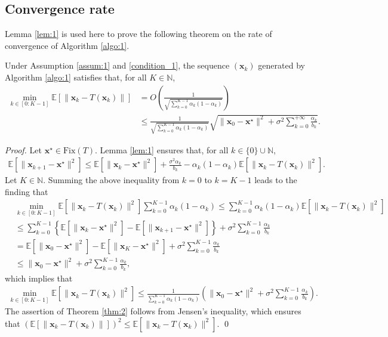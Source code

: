 \documentclass[smallextended,referee,envcountsect,]{svjour3}
\begin{document}
\subsection{Convergence rate}
\label{sec:3.2}
Lemma \ref{lem:1} is used here to prove the following theorem on the rate of convergence of Algorithm \ref{algo:1}.

\begin{theorem}\label{thm:2}
Under Assumption \ref{assum:1} and \eqref{condition_1}, the sequence $(\bm{x}_k)$ generated by Algorithm \ref{algo:1} satisfies that, for all $K \in \mathbb{N}$,
\begin{align*}
\min_{k \in [0:K-1]} \mathbb{E} \left[ \| \bm{x}_k - T (\bm{x}_{k})\| \right]
&= 
O \left( \frac{1}{\sqrt{\sum_{k=0}^{K-1} \alpha_k (1 - \alpha_k)}} \right)\\
&\leq
\frac{1}{\sqrt{\sum_{k=0}^{K-1} \alpha_k (1 - \alpha_k)}}
\sqrt{ \| \bm{x}_{0} - \bm{x}^\star \|^2 
+ 
\sigma^2 \sum_{k=0}^{+ \infty} \frac{\alpha_k}{b_k}
}.
\end{align*}
\end{theorem}

\begin{proof}
Let $\bm{x}^\star \in \mathrm{Fix}(T)$. Lemma \ref{lem:1} ensures that, for all $k \in \{0\} \cup \mathbb{N}$,
\begin{align*}
\mathbb{E} \left[ \| \bm{x}_{k+1} - \bm{x}^\star \|^2 \right]
\leq 
\mathbb{E} \left[ \| \bm{x}_{k} - \bm{x}^\star \|^2 \right] + \frac{\sigma^2 \alpha_k}{b_k}
- \alpha_k (1 - \alpha_k) \mathbb{E} \left[ \| \bm{x}_k - T (\bm{x}_{k})\|^2 \right].
\end{align*}
Let $K \in \mathbb{N}$. Summing the above inequality from $k = 0$ to $k = K-1$ leads to the finding that 
\begin{align*}
&
\min_{k \in [0:K-1]} \mathbb{E} \left[ \| \bm{x}_k - T (\bm{x}_{k})\|^2 \right]
\sum_{k=0}^{K-1} \alpha_k (1 - \alpha_k)
\leq
\sum_{k=0}^{K-1} \alpha_k (1 - \alpha_k) \mathbb{E} \left[ \| \bm{x}_k - T (\bm{x}_{k})\|^2 \right]\\
&\leq
\sum_{k=0}^{K-1} \left\{ \mathbb{E} \left[ \| \bm{x}_{k} - \bm{x}^\star \|^2 \right]
- 
\mathbb{E} \left[ \| \bm{x}_{k+1} - \bm{x}^\star \|^2 \right] 
\right\}
+ 
\sigma^2 \sum_{k=0}^{K-1} \frac{\alpha_k}{b_k}\\
&= 
\mathbb{E} \left[ \| \bm{x}_{0} - \bm{x}^\star \|^2 \right]
- 
\mathbb{E} \left[ \| \bm{x}_{K} - \bm{x}^\star \|^2 \right]
+ 
\sigma^2 \sum_{k=0}^{K-1} \frac{\alpha_k}{b_k}\\
&\leq 
\| \bm{x}_{0} - \bm{x}^\star \|^2 
+ 
\sigma^2 \sum_{k=0}^{K-1} \frac{\alpha_k}{b_k}, 
\end{align*} 
which implies that
\begin{align*}
\min_{k \in [0:K-1]} \mathbb{E} \left[ \| \bm{x}_k - T (\bm{x}_{k})\|^2 \right]
\leq
\frac{1}{\sum_{k=0}^{K-1} \alpha_k (1 - \alpha_k)}
\left( \| \bm{x}_{0} - \bm{x}^\star \|^2 
+ 
\sigma^2 \sum_{k=0}^{K-1} \frac{\alpha_k}{b_k}
\right).
\end{align*}
The assertion of Theorem \ref{thm:2} follows from Jensen’s inequality, which ensures that $(\mathbb{E} [ \| \bm{x}_k - T (\bm{x}_{k})\|])^2 \leq \mathbb{E} [ \| \bm{x}_k - T (\bm{x}_{k})\|^2 ]$.
\qed 
\end{proof}
\end{document}
